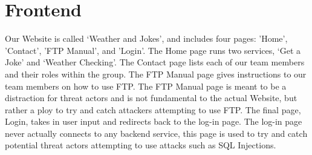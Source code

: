 \section{Frontend}

Our Website is called ‘Weather and Jokes’, and includes four pages: 'Home', 'Contact', 'FTP Manual', and 'Login'. The Home page runs two services, ‘Get a Joke’ and ‘Weather Checking’. The Contact page lists each of our team members and their roles within the group. The FTP Manual page gives instructions to our team members on how to use FTP. The FTP Manual page is meant to be a distraction for threat actors and is not fundamental to the actual Website, but rather a ploy to try and catch attackers attempting to use FTP. The final page, Login, takes in user input and redirects back to the log-in page. The log-in page never actually connects to any backend service, this page is used to try and catch potential threat actors attempting to use attacks such as SQL Injections.
